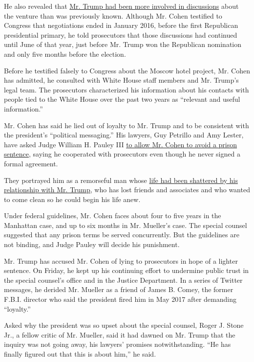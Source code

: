 He also revealed that
\href{https://www.nytimes.com/2018/11/29/nyregion/michael-cohen-trump-russia-mueller.html?module=inline}{Mr.
Trump had been more involved in discussions} about the venture than was
previously known. Although Mr. Cohen testified to Congress that
negotiations ended in January 2016, before the first Republican
presidential primary, he told prosecutors that those discussions had
continued until June of that year, just before Mr. Trump won the
Republican nomination and only five months before the election.

Before he testified falsely to Congress about the Moscow hotel project,
Mr. Cohen has admitted, he consulted with White House staff members and
Mr. Trump's legal team. The prosecutors characterized his information
about his contacts with people tied to the White House over the past two
years as ``relevant and useful information.''

Mr. Cohen has said he lied out of loyalty to Mr. Trump and to be
consistent with the president's ``political messaging.'' His lawyers,
Guy Petrillo and Amy Lester, have asked Judge William H. Pauley III
\href{https://www.nytimes.com/2018/12/01/nyregion/michael-cohen-leniency.html}{to
allow Mr. Cohen to avoid a prison sentence}, saying he cooperated with
prosecutors even though he never signed a formal agreement.

They portrayed him as a remorseful man whose
\href{https://www.nytimes.com/2018/12/03/nyregion/michael-cohen-trump-strategy.html}{life
had been shattered by his relationship with Mr. Trump}, who has lost
friends and associates and who wanted to come clean so he could begin
his life anew.

Under federal guidelines, Mr. Cohen faces about four to five years in
the Manhattan case, and up to six months in Mr. Mueller's case. The
special counsel suggested that any prison terms be served concurrently.
But the guidelines are not binding, and Judge Pauley will decide his
punishment.

Mr. Trump has accused Mr. Cohen of lying to prosecutors in hope of a
lighter sentence. On Friday, he kept up his continuing effort to
undermine public trust in the special counsel's office and in the
Justice Department. In a series of Twitter messages, he derided Mr.
Mueller as a friend of James B. Comey, the former F.B.I. director who
said the president fired him in May 2017 after demanding ``loyalty.''

Asked why the president was so upset about the special counsel, Roger J.
Stone Jr., a fellow critic of Mr. Mueller, said it had dawned on Mr.
Trump that the inquiry was not going away, his lawyers' promises
notwithstanding. ``He has finally figured out that this is about him,''
he said.

